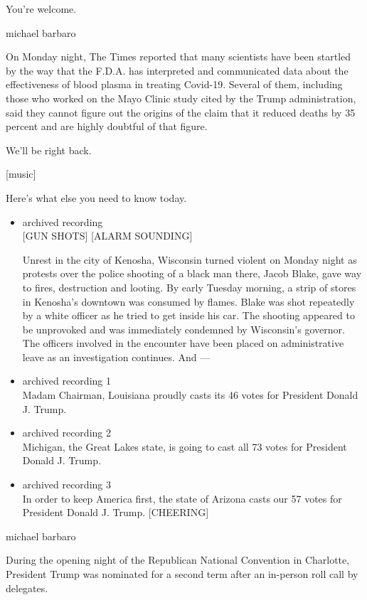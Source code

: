 You're welcome.

michael barbaro

On Monday night, The Times reported that many scientists have been
startled by the way that the F.D.A. has interpreted and communicated
data about the effectiveness of blood plasma in treating Covid-19.
Several of them, including those who worked on the Mayo Clinic study
cited by the Trump administration, said they cannot figure out the
origins of the claim that it reduced deaths by 35 percent and are highly
doubtful of that figure.

We'll be right back.

{[}music{]}

Here's what else you need to know today.

\begin{itemize}
\item
  archived recording\\
  {[}GUN SHOTS{]} {[}ALARM SOUNDING{]}

  Unrest in the city of Kenosha, Wisconsin turned violent on Monday
  night as protests over the police shooting of a black man there, Jacob
  Blake, gave way to fires, destruction and looting. By early Tuesday
  morning, a strip of stores in Kenosha's downtown was consumed by
  flames. Blake was shot repeatedly by a white officer as he tried to
  get inside his car. The shooting appeared to be unprovoked and was
  immediately condemned by Wisconsin's governor. The officers involved
  in the encounter have been placed on administrative leave as an
  investigation continues. And ---
\item
  archived recording 1\\
  Madam Chairman, Louisiana proudly casts its 46 votes for President
  Donald J. Trump.
\item
  archived recording 2\\
  Michigan, the Great Lakes state, is going to cast all 73 votes for
  President Donald J. Trump.
\item
  archived recording 3\\
  In order to keep America first, the state of Arizona casts our 57
  votes for President Donald J. Trump. {[}CHEERING{]}
\end{itemize}

michael barbaro

During the opening night of the Republican National Convention in
Charlotte, President Trump was nominated for a second term after an
in-person roll call by delegates.

